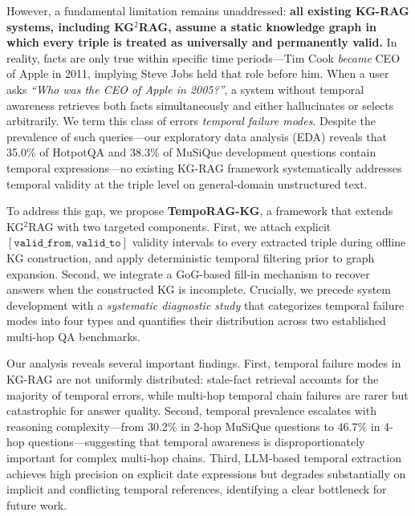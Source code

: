 \documentclass[11pt]{article}
\begin{document}
However, a fundamental limitation remains unaddressed: \textbf{all existing
KG-RAG systems, including KG$^2$RAG, assume a static knowledge graph in
which every triple is treated as universally and permanently valid.} In
reality, facts are only true within specific time periods---Tim Cook
\textit{became} CEO of Apple in 2011, implying Steve Jobs held that role
before him. When a user asks \textit{``Who was the CEO of Apple in 2005?''},
a system without temporal awareness retrieves both facts simultaneously and
either hallucinates or selects arbitrarily. We term this class of errors
\textit{temporal failure modes}. Despite the prevalence of such queries---our
exploratory data analysis (EDA) reveals that 35.0\% of HotpotQA and 38.3\%
of MuSiQue development questions contain temporal expressions---no existing
KG-RAG framework systematically addresses temporal validity at the
triple level on general-domain unstructured text.

To address this gap, we propose \textbf{TempoRAG-KG}, a framework that
extends KG$^2$RAG with two targeted components. First, we attach explicit
$[\mathtt{valid\_from}, \mathtt{valid\_to}]$ validity intervals to every
extracted triple during offline KG construction, and apply deterministic
temporal filtering prior to graph expansion. Second, we integrate a
GoG-based fill-in mechanism \cite{he2024gog} to recover answers when the
constructed KG is incomplete. Crucially, we precede system development
with a \textit{systematic diagnostic study} that categorizes temporal
failure modes into four types and quantifies their distribution across
two established multi-hop QA benchmarks.

Our analysis reveals several important findings. First, temporal failure
modes in KG-RAG are not uniformly distributed: stale-fact retrieval
accounts for the majority of temporal errors, while multi-hop temporal
chain failures are rarer but catastrophic for answer quality. Second,
temporal prevalence escalates with reasoning complexity---from 30.2\% in
2-hop MuSiQue questions to 46.7\% in 4-hop questions---suggesting that
temporal awareness is disproportionately important for complex multi-hop
chains. Third, LLM-based temporal extraction achieves high precision on
explicit date expressions but degrades substantially on implicit and
conflicting temporal references, identifying a clear bottleneck for
future work.
\end{document}
